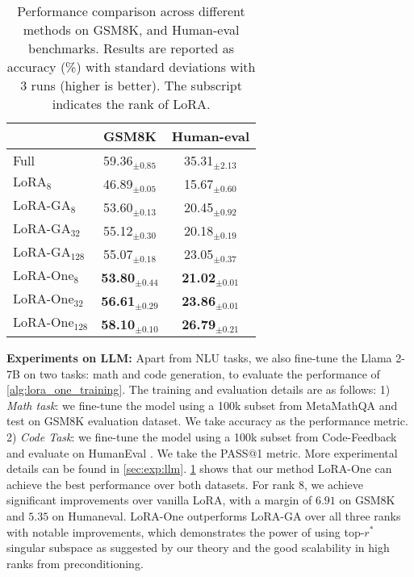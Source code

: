 \begin{table}[t]
\centering
\caption{Performance comparison across different methods on GSM8K, and Human-eval benchmarks. Results are reported as accuracy (\%) with standard deviations with 3 runs (higher is better). The subscript indicates the rank of LoRA.}
\label{tab:performance}
\begin{tabular}{lcc}
\toprule
\textbf{}& \textbf{GSM8K} & \textbf{Human-eval} \\
\midrule
Full & {59.36}$_{\pm 0.85}$ & {35.31}$_{\pm 2.13}$ \\
\midrule
$\text{LoRA}_{8}$ & {46.89}$_{\pm 0.05}$ & {15.67}$_{\pm 0.60}$ \\
\midrule
$\text{LoRA-GA}_{8}$ & {53.60}$_{\pm 0.13}$ & {20.45}$_{\pm 0.92}$ \\
$\text{LoRA-GA}_{32}$  & {55.12}$_{\pm 0.30}$ & {20.18}$_{\pm 0.19}$ \\
$\text{LoRA-GA}_{128}$ & {55.07}$_{\pm 0.18}$ & {23.05}$_{\pm 0.37}$\\
\midrule
$\text{LoRA-One}_{8}$ & \textbf{53.80}$_{\pm 0.44}$ & \textbf{21.02}$_{\pm 0.01}$ \\
$\text{LoRA-One}_{32}$ & \textbf{56.61}$_{\pm 0.29}$ & \textbf{23.86}$_{\pm 0.01}$ \\
$\text{LoRA-One}_{128}$ & \textbf{58.10}$_{\pm 0.10}$ & \textbf{26.79}$_{\pm 0.21}$ \\
\bottomrule
\end{tabular}
\end{table}

\noindent
{\bf Experiments on LLM:} Apart from NLU tasks, we also fine-tune the Llama 2-7B \citep{touvron2023llama} on two tasks: math and code generation, to evaluate the performance of \cref{alg:lora_one_training}. The training and evaluation details are as follows: 1) \textit{Math task}: we fine-tune the model using a 100k subset from MetaMathQA \citep{yu2023metamath} and test on GSM8K \citep{cobbe2021training} evaluation dataset. We take accuracy as the performance metric. 2) \textit{Code Task}: we fine-tune the model using a 100k subset from Code-Feedback \citep{zheng2024opencodeinterpreter} and evaluate on HumanEval \citep{chen2021evaluating}. We take the PASS@1 metric. More experimental details can be found in \cref{sec:exp:llm}.
\cref{tab:performance} shows that our method LoRA-One can achieve the best performance over both datasets. For rank $8$, we achieve significant improvements over vanilla LoRA, with a margin of $6.91$ on GSM8K and $5.35$ on Humaneval. LoRA-One outperforms LoRA-GA over all three ranks with notable improvements, which demonstrates the power of using  top-$r^*$ singular subspace as suggested by our theory and the good scalability in high ranks from preconditioning.\medskip

